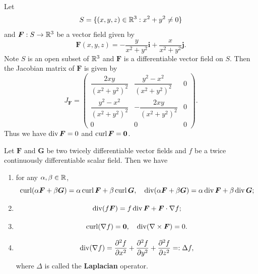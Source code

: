 \begin{exampleenv}
    Let
    $$S = \{(x,y,z)\in \mathbb{R}^3: x^2 + y^2 \ne 0\}$$
    and $\bm F: S\to \mathbb{R}^3$ be a vector field given by
    $$ \bm F(x,y,z) =  -\dfrac{y}{x^2 + y^2}\bm i + \dfrac{x}{x^2 + y^2}\bm j. $$
    Note $S$ is an open subset of $\mathbb{R}^3$ and $\bm F$ is a differentiable vector field on $S$. Then the Jacobian matrix of $\bm F$ is given by
    $$ J_{\bm F} = \begin{pmatrix}
        \dfrac{2xy}{(x^2 + y^2)^2} & \dfrac{y^2 - x^2}{(x^2 + y^2)^2} & 0\\[6pt]
        \dfrac{y^2-x^2}{(x^2 + y^2)^2} & -\dfrac{2xy}{(x^2 + y^2)^2} & 0\\[6pt]
        0 & 0 & 0
    \end{pmatrix}. $$
    Thus we have $\operatorname{\mathrm{div}} \bm F = 0$ and $\operatorname{\mathrm{curl}} \bm F = \bm 0$. 
\end{exampleenv}
\begin{propositionenv}
    Let $\bm F$ and $\bm G$ be two twicely differentiable vector fields and $f$ be a twice continuously differentiable scalar field. Then we have
    \begin{enumerate}[label=(\arabic*)]
        \item for any $\alpha, \beta \in \mathbb{R}$,
        $$ \operatorname{\mathrm{curl}}(\alpha\bm F + \beta\bm G) = \alpha\operatorname{\mathrm{curl}} \bm F + \beta\operatorname{\mathrm{curl}} \bm G, \quad \operatorname{\mathrm{div}}(\alpha\bm F + \beta\bm G) = \alpha\operatorname{\mathrm{div}} \bm F + \beta\operatorname{\mathrm{div}} \bm G; $$
        \item $$ \operatorname{\mathrm{div}}(f\bm F) = f \operatorname{\mathrm{div}} \bm F + \bm F \cdot \nabla f; $$
        \item $$ \operatorname{\mathrm{curl}}(\nabla f) = \bm 0, \quad \operatorname{\mathrm{div}}(\nabla\times \bm F) = 0. $$
        \item $$ \operatorname{\mathrm{div}} (\nabla f) = \pdv[2]{f}{x} + \pdv[2]{f}{y} + \pdv[2]{f}{z} =: \Delta f, $$
        where $\Delta$ is called the \textbf{Laplacian} operator.
    \end{enumerate}
\end{propositionenv}

